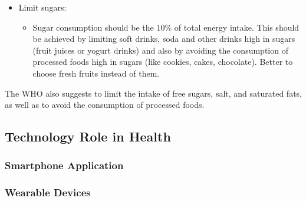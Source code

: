 \begin{itemize}[nosep]
\begin{itemize}[nosep]
          \end{itemize}
          \vspace{3ex}
    \item Limit sugars:\vspace{2ex}
          \begin{itemize}[nosep]
              \item Sugar consumption should be the 10\% of total energy intake. This should be achieved by limiting soft drinks, soda and other drinks high in sugars (fruit juices or yogurt drinks) and also by avoiding the consumption of processed foods high in sugars (like cookies, cakes, chocolate). Better to choose fresh fruits instead of them.
          \end{itemize}
\end{itemize}
\vspace{3ex}
The WHO also suggests to limit the intake of free sugars, salt, and saturated fats, as well as to avoid the consumption of processed foods.
\subsection{Technology Role in Health}
\subsubsection{Smartphone Application}
\subsubsection{Wearable Devices}